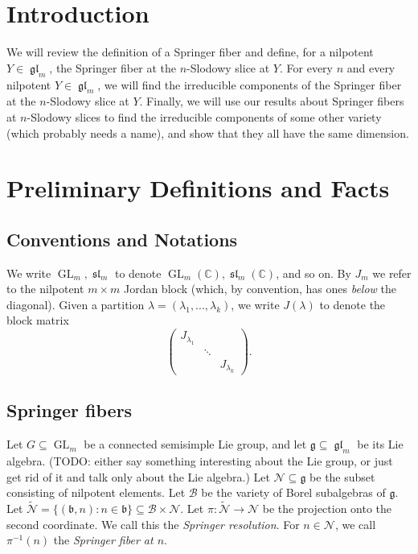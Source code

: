 \documentclass[12pt,psamsfonts]{article}
\DeclareMathOperator{\GL}{GL}
\DeclareMathOperator{\gl}{\mathfrak{gl}}
\DeclareMathOperator{\spl}{\mathfrak{sl}}
\begin{document}

\section{Introduction}
We will review the definition of a Springer fiber and define, for a nilpotent \(Y \in \gl_m\), the Springer fiber at the \(n\)-Slodowy slice at \(Y\).
For every \(n\) and every nilpotent \(Y \in \gl_m\), we will find the irreducible components of the Springer fiber at the \(n\)-Slodowy slice at \(Y\).
Finally, we will use our results about Springer fibers at \(n\)-Slodowy slices to find the irreducible components of some other variety (which probably needs a name), and show that they all have the same dimension.

\section{Preliminary Definitions and Facts}
\subsection{Conventions and Notations}
We write \(\GL_m, \spl_m\) to denote \(\GL_m(\mathbb{C}), \spl_m(\mathbb{C})\), and so on.
By \(J_m\) we refer to the nilpotent \(m \times m\) Jordan block (which, by convention, has ones \emph{below} the diagonal).
Given a partition \(\lambda = (\lambda_1, ..., \lambda_k)\), we write \(J(\lambda)\) to denote the block matrix
\[\begin{pmatrix}
    J_{\lambda_1} \\
    & \ddots \\
    & & J_{\lambda_k}
\end{pmatrix}.\]



\subsection{Springer fibers}
Let \(G \subseteq \GL_m\) be a connected semisimple Lie group, and let \(\mathfrak{g} \subseteq \gl_m\) be its Lie algebra.
(TODO: either say something interesting about the Lie group, or just get rid of it and talk only about the Lie algebra.)
Let \(\mathcal{N} \subseteq \mathfrak{g}\) be the subset consisting of nilpotent elements.
Let \(\mathcal{B}\) be the variety of Borel subalgebras of \(\mathfrak{g}\).
Let \(\widetilde{\mathcal{N}} = \{(\mathfrak{b}, n) : n \in \mathfrak{b}\} \subseteq \mathcal{B} \times \mathcal{N}\).
Let \(\pi : \widetilde{\mathcal{N}} \to \mathcal{N}\) be the projection onto the second coordinate.
We call this the \emph{Springer resolution}.
For \(n \in \mathcal{N}\), we call \(\pi^{-1}(n)\) the \emph{Springer fiber at \(n\)}.
\end{document}

